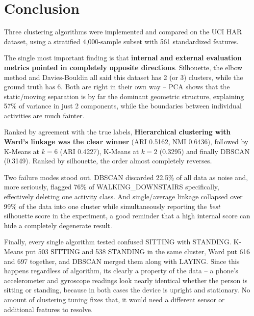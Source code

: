 \documentclass[12pt,a4paper]{article}
\begin{document}
\section{Conclusion}
Three clustering algorithms were implemented and compared on the UCI HAR dataset, using a stratified 4,000-sample subset with 561 standardized features.

The single most important finding is that \textbf{internal and external evaluation metrics pointed in completely opposite directions}. Silhouette, the elbow method and Davies-Bouldin all said this dataset has 2 (or 3) clusters, while the ground truth has 6. Both are right in their own way -- PCA shows that the static/moving separation is by far the dominant geometric structure, explaining 57\% of variance in just 2 components, while the boundaries between individual activities are much fainter.

Ranked by agreement with the true labels, \textbf{Hierarchical clustering with Ward's linkage was the clear winner} (ARI 0.5162, NMI 0.6436), followed by K-Means at $k=6$ (ARI 0.4227), K-Means at $k=2$ (0.3295) and finally DBSCAN (0.3149). Ranked by silhouette, the order almost completely reverses.

Two failure modes stood out. DBSCAN discarded 22.5\% of all data as noise and, more seriously, flagged 76\% of WALKING\_DOWNSTAIRS specifically, effectively deleting one activity class. And single/average linkage collapsed over 99\% of the data into one cluster while simultaneously reporting the \textit{best} silhouette score in the experiment, a good reminder that a high internal score can hide a completely degenerate result.

Finally, every single algorithm tested confused SITTING with STANDING. K-Means put 503 SITTING and 538 STANDING in the same cluster, Ward put 616 and 697 together, and DBSCAN merged them along with LAYING. Since this happens regardless of algorithm, its clearly a property of the data -- a phone's accelerometer and gyroscope readings look nearly identical whether the person is sitting or standing, because in both cases the device is upright and stationary. No amount of clustering tuning fixes that, it would need a different sensor or additional features to resolve.
\end{document}
